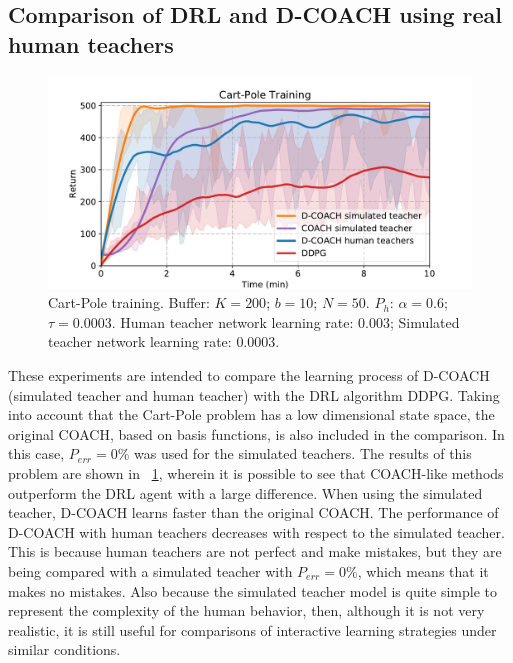\subsection{Comparison of DRL and D-COACH using real human teachers}
\begin{figure}[t]
    \centering
    \vspace{-0.2cm}
    \includegraphics[width=0.9\linewidth]{imagenes/cap3/offline_cart_pole_humans.pdf}
    \vspace{-0.2cm}
    \caption{Cart-Pole training. Buffer: $K = 200$; $b = 10$; $N = 50$. $P_{h}$: $\alpha = 0.6$; $\tau = 0.0003$. Human teacher network learning rate: $0.003$; Simulated teacher network learning rate: $0.0003$.}
    \label{fig:cartpole_results}
\end{figure}

These experiments are intended to compare the learning process of D-COACH (simulated teacher and human teacher) with the DRL algorithm DDPG. Taking into account that the Cart-Pole problem has a low dimensional state space, the original COACH, based on basis functions, is also included in the comparison. In this case, $P_\mathit{err}=0\%$ was used for the simulated teachers. The results of this problem are shown in \figurename~{\ref{fig:cartpole_results}}, wherein it is possible to see that COACH-like methods outperform the DRL agent with a large difference. When using the simulated teacher, D-COACH learns faster than the original COACH. The performance of D-COACH with human teachers decreases with respect to the simulated teacher. This is because human teachers are not perfect and make mistakes, but they are being compared with a simulated teacher with $P_\mathit{err}=0\%$, which means that it makes no mistakes. Also because the simulated teacher model is quite simple to represent the complexity of the human behavior, then, although it is not very realistic, it is still useful for comparisons of interactive learning strategies under similar conditions.

